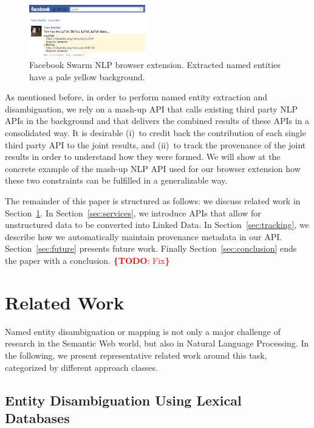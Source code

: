 \documentclass[twocolumn]{article}
\newcommand{\todo}[1]{\noindent\textcolor{red}{{\bf \{TODO}: #1{\bf \}}}}
\begin{document}
\begin{figure}[htb!]
  \centering
    \includegraphics[width=0.45\textwidth]{facebook-swarm-nlp.png}
  \caption{Facebook Swarm NLP browser extension. Extracted named entities have a pale yellow background.}     
  \label{fig:facebook}
\end{figure}

As mentioned before, in order to perform named entity extraction and disambiguation, we rely on a mash-up API that calls existing third party NLP APIs in the background and that delivers the combined results of these APIs in a consolidated way. It is  desirable (i)~to credit back the contribution of each single third party API to the joint results, and (ii)~to track the provenance of the joint results in order to understand how they were formed. We will show at the concrete example of the mash-up NLP API used for our browser extension how these two constraints can be fulfilled in a generalizable way.

The remainder of this paper is structured as follows: we discuss related work in Section~\ref{sec:related}. In Section~\ref{sec:services}, we introduce APIs that allow for unstructured data to be converted into Linked Data. In Section~\ref{sec:tracking}, we describe how we automatically maintain provenance metadata in our API. Section~\ref{sec:future} presents future work. Finally Section~\ref{sec:conclusion} ends the paper with a conclusion. \todo{Fix}

\section{Related Work}\label{sec:related}
Named entity disambiguation or mapping is not only a major challenge of research in the Semantic Web world, but also in 
Natural Language Processing. In the following, we present representative related work around this task, categorized by
different approach classes. 

\subsection{Entity Disambiguation Using Lexical Databases}
\end{document}
